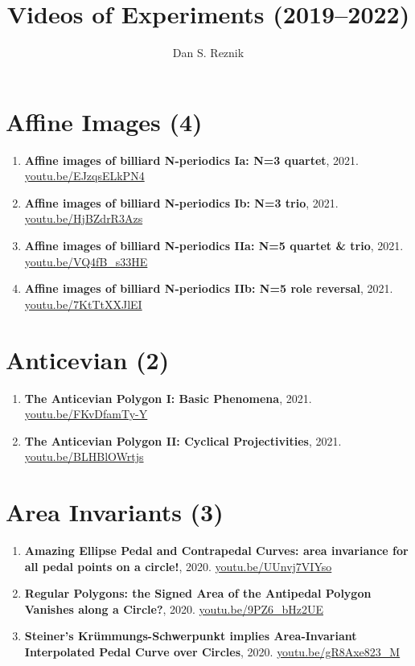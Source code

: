 \documentclass[12pt]{article}
\title{Videos of Experiments (2019--2022)}
\author{Dan S. Reznik}
\begin{document}
\maketitle

\tableofcontents
\section{Affine Images (4)}

\begin{enumerate}[resume]
\item \textbf{Affine images of billiard N-periodics Ia: N=3 quartet}, 2021. \href{https://youtu.be/EJzqsELkPN4}{\url{youtu.be/EJzqsELkPN4}}
\item \textbf{Affine images of billiard N-periodics Ib: N=3 trio}, 2021. \href{https://youtu.be/HjBZdrR3Azs}{\url{youtu.be/HjBZdrR3Azs}}
\item \textbf{Affine images of billiard N-periodics IIa: N=5 quartet \& trio}, 2021. \href{https://youtu.be/VQ4fB_s33HE}{\url{youtu.be/VQ4fB\_s33HE}}
\item \textbf{Affine images of billiard N-periodics IIb: N=5 role reversal}, 2021. \href{https://youtu.be/7KtTtXXJlEI}{\url{youtu.be/7KtTtXXJlEI}}
\end{enumerate}

\section{Anticevian (2)}

\begin{enumerate}[resume]
\item \textbf{The Anticevian Polygon I: Basic Phenomena}, 2021. \href{https://youtu.be/FKvDfamTy-Y}{\url{youtu.be/FKvDfamTy-Y}}
\item \textbf{The Anticevian Polygon II: Cyclical Projectivities}, 2021. \href{https://youtu.be/BLHBlOWrtjs}{\url{youtu.be/BLHBlOWrtjs}}
\end{enumerate}

\section{Area Invariants (3)}

\begin{enumerate}[resume]
\item \textbf{Amazing Ellipse Pedal and Contrapedal Curves: area invariance for all pedal points on a circle!}, 2020. \href{https://youtu.be/UUnvj7VIYso}{\url{youtu.be/UUnvj7VIYso}}
\item \textbf{Regular Polygons: the Signed Area of the Antipedal Polygon Vanishes along a Circle?}, 2020. \href{https://youtu.be/9PZ6_bHz2UE}{\url{youtu.be/9PZ6\_bHz2UE}}
\item \textbf{Steiner's Krümmungs-Schwerpunkt implies Area-Invariant Interpolated Pedal Curve over Circles}, 2020. \href{https://youtu.be/gR8Axe823_M}{\url{youtu.be/gR8Axe823\_M}}
\end{enumerate}
\end{document}
